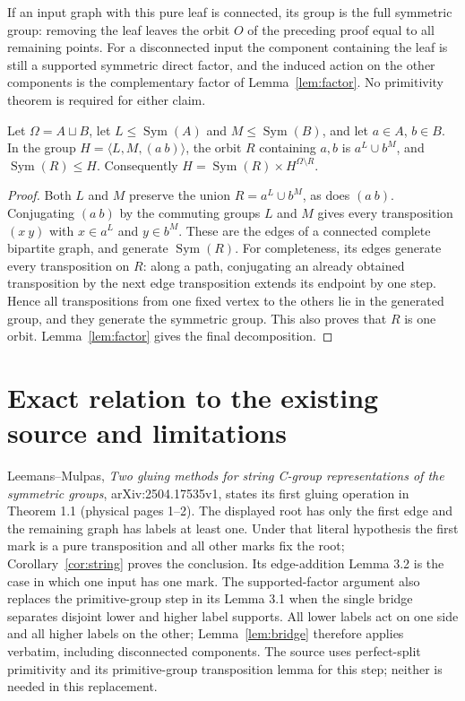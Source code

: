 \documentclass[a4paper,11pt]{article}
\newcommand{\Sym}{\operatorname{Sym}}
\newcommand{\gen}[1]{\langle #1\rangle}
\begin{document}
If an input graph with this pure leaf is connected, its group is the full
symmetric group: removing the leaf leaves the orbit $O$ of the preceding
proof equal to all remaining points. For a disconnected input the component
containing the leaf is still a supported symmetric direct factor, and the
induced action on the other components is the complementary factor of
Lemma~\ref{lem:factor}. No primitivity theorem is required for either claim.

\begin{lemma}\label{lem:bridge}
Let $\Omega=A\sqcup B$, let $L\leq\Sym(A)$ and $M\leq\Sym(B)$,
and let $a\in A$, $b\in B$. In the group
$H=\gen{L,M,(a\ b)}$, the orbit $R$ containing $a,b$ is
$a^L\cup b^M$, and $\Sym(R)\leq H$. Consequently
$H=\Sym(R)\times H^{\Omega\setminus R}$.
\end{lemma}
\begin{proof}
Both $L$ and $M$ preserve the union $R=a^L\cup b^M$, as does $(a\ b)$.
Conjugating $(a\ b)$ by the commuting groups $L$ and $M$ gives every
transposition $(x\ y)$ with $x\in a^L$ and $y\in b^M$.
These are the edges of a connected complete bipartite graph, and generate
$\Sym(R)$. For completeness, its edges generate every transposition on $R$:
along a path, conjugating an already obtained transposition by the next
edge transposition extends its endpoint by one step. Hence all transpositions
from one fixed vertex to the others lie in the generated group, and they
generate the symmetric group. This also proves that $R$ is one orbit.
Lemma~\ref{lem:factor} gives the final decomposition.
\end{proof}

\section{Exact relation to the existing source and limitations}
Leemans--Mulpas, \emph{Two gluing methods for string C-group representations
of the symmetric groups}, arXiv:2504.17535v1, states its first gluing operation
in Theorem 1.1 (physical pages 1--2). The displayed root has only the first
edge and the remaining graph has labels at least one. Under that literal
hypothesis the first mark is a pure transposition and all other marks fix the
root; Corollary~\ref{cor:string} proves the conclusion. Its edge-addition
Lemma 3.2 is the case in which one input has one mark. The supported-factor
argument also replaces the primitive-group step in its Lemma 3.1 when the
single bridge separates disjoint lower and higher label supports. All lower labels act on one side and all higher labels on the other;
Lemma~\ref{lem:bridge} therefore applies verbatim, including disconnected
components. The source uses perfect-split primitivity and its primitive-group
transposition lemma for this step; neither is needed in this replacement.
\end{document}
